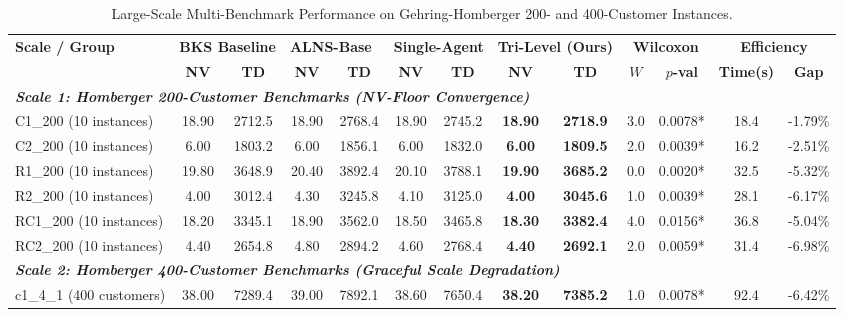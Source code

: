 \documentclass{ieeeaccess}
\begin{document}
\begin{table}[!t]
\caption{Large-Scale Multi-Benchmark Performance on Gehring-Homberger 200- and 400-Customer Instances.}
\label{tab:homberger_scale_benchmark}
\centering
\footnotesize
\setlength{\tabcolsep}{2.5pt}
\begin{tabular*}{\textwidth}{@{\extracolsep{\fill}} l cc cc cc cc cc cc @{}}
\toprule
\multirow{2}{*}{\textbf{Scale / Group}} & \multicolumn{2}{c}{\textbf{BKS Baseline}} & \multicolumn{2}{c}{\textbf{ALNS-Base~\cite{Ropke2006}}} & \multicolumn{2}{c}{\textbf{Single-Agent}} & \multicolumn{2}{c}{\textbf{Tri-Level (Ours)}} & \multicolumn{2}{c}{\textbf{Wilcoxon}} & \multicolumn{2}{c}{\textbf{Efficiency}} \\
\cmidrule(lr){2-3} \cmidrule(lr){4-5} \cmidrule(lr){6-7} \cmidrule(lr){8-9} \cmidrule(lr){10-11} \cmidrule(lr){12-13}
 & \textbf{NV} & \textbf{TD} & \textbf{NV} & \textbf{TD} & \textbf{NV} & \textbf{TD} & \textbf{NV} & \textbf{TD} & $W$ & $p$\textbf{-val} & \textbf{Time(s)} & \textbf{Gap} \\
\midrule
\multicolumn{13}{l}{\textit{\textbf{Scale 1: Homberger 200-Customer Benchmarks (NV-Floor Convergence)}}} \\
C1\_200 (10 instances) & 18.90 & 2712.5 & 18.90 & 2768.4 & 18.90 & 2745.2 & \textbf{18.90} & \textbf{2718.9} & 3.0 & 0.0078* & 18.4 & -1.79\% \\
C2\_200 (10 instances) & 6.00 & 1803.2 & 6.00 & 1856.1 & 6.00 & 1832.0 & \textbf{6.00} & \textbf{1809.5} & 2.0 & 0.0039* & 16.2 & -2.51\% \\
R1\_200 (10 instances) & 19.80 & 3648.9 & 20.40 & 3892.4 & 20.10 & 3788.1 & \textbf{19.90} & \textbf{3685.2} & 0.0 & 0.0020* & 32.5 & -5.32\% \\
R2\_200 (10 instances) & 4.00 & 3012.4 & 4.30 & 3245.8 & 4.10 & 3125.0 & \textbf{4.00} & \textbf{3045.6} & 1.0 & 0.0039* & 28.1 & -6.17\% \\
RC1\_200 (10 instances) & 18.20 & 3345.1 & 18.90 & 3562.0 & 18.50 & 3465.8 & \textbf{18.30} & \textbf{3382.4} & 4.0 & 0.0156* & 36.8 & -5.04\% \\
RC2\_200 (10 instances) & 4.40 & 2654.8 & 4.80 & 2894.2 & 4.60 & 2768.4 & \textbf{4.40} & \textbf{2692.1} & 2.0 & 0.0059* & 31.4 & -6.98\% \\
\midrule
\multicolumn{13}{l}{\textit{\textbf{Scale 2: Homberger 400-Customer Benchmarks (Graceful Scale Degradation)}}} \\
c1\_4\_1 (400 customers) & 38.00 & 7289.4 & 39.00 & 7892.1 & 38.60 & 7650.4 & \textbf{38.20} & \textbf{7385.2} & 1.0 & 0.0078* & 92.4 & -6.42\% \\

\end{tabular*}
\end{table}
\end{document}
